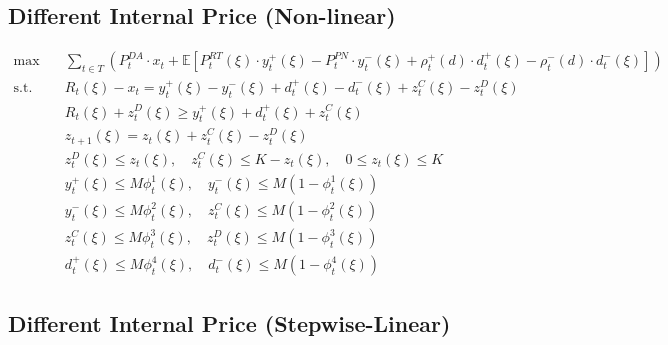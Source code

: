 \documentclass[10pt]{article}
\begin{document}
\subsection{Different Internal Price (Non-linear)}
\begin{subequations}
    \begin{align}
        \text{max} \quad &\sum_{t\in T}\left(P_t^{DA} \cdot x_{t} + \mathbb{E}\left[P_t^{RT}(\xi) \cdot y^+_{t}(\xi) - P_t^{PN} \cdot y^-_{t}(\xi) + \rho^+_t(d) \cdot d^+_{t}(\xi) - \rho^-_t(d) \cdot d^-_{t}(\xi)\right]\right)&\\   
        \text{s.t.} \quad &R_{t}(\xi) - x_{t} = y_{t}^{+}(\xi) - y_{t}^{-}(\xi) + d^+_{t}(\xi) - d^-_{t}(\xi) + z^C_{t}(\xi) - z^D_{t}(\xi) &\\
        & R_{t}(\xi) + z^D_{t}(\xi) \geq y^+_{t}(\xi) + d^+_{t}(\xi) + z^C_{t}(\xi) & \\
        &z_{t+1}(\xi) = z_{t}(\xi) + z^C_{t}(\xi) - z^D_{t}(\xi)&\\
        &z^D_{t}(\xi) \le z_{t}(\xi), \quad z^C_{t}(\xi) \le K - z_{t}(\xi), \quad 0 \leq z_{t}(\xi) \leq K &\\
        &y^+_{t}(\xi) \leq M \phi^1_{t}(\xi), \quad y^-_{t}(\xi) \leq M (1 - \phi^1_{t}(\xi)) &\\
        &y^-_{t}(\xi) \leq M \phi^2_{t}(\xi), \quad z^C_{t}(\xi) \leq M (1 - \phi^2_{t}(\xi)) &\\
        &z^C_{t}(\xi) \leq M \phi^3_{t}(\xi), \quad z^D_{t}(\xi) \leq M (1 - \phi^3_{t}(\xi)) &\\
        &d^+_{t}(\xi) \leq M \phi^4_{t}(\xi), \quad d^-_{t}(\xi) \leq M (1 - \phi^4_{t}(\xi))&
    \end{align}
\end{subequations}

\subsection{Different Internal Price (Stepwise-Linear)}
\end{document}
